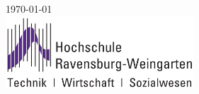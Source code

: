\documentclass[a4paper,11pt,singlespacing]{article}
\begin{document}
\begin{titlepage}
	
	
	{\large \today}\\[3cm] %
	
	
	
	\includegraphics[width=7cm]{images/logo.png} %
	
	
	\vfill %
	
\end{titlepage}


\tableofcontents
\pagebreak









\printbibliography[heading=bibintoc]
\end{document}

